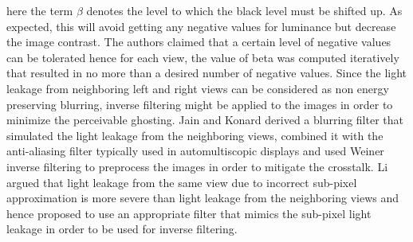 here the term $\beta$ denotes the level to which the black level must be shifted up. As expected, this will avoid getting any negative values for luminance but decrease the image contrast. The authors claimed that a certain level of negative values can be tolerated hence for each view, the value of beta was computed iteratively that resulted in no more than a desired number of negative values. Since the light leakage from neighboring left and right views can be considered as non energy preserving blurring, inverse filtering might be applied to the images in order to minimize the perceivable ghosting. Jain and Konard \cite{jain2007crosstalk} derived a blurring filter that simulated the light leakage from the neighboring views, combined it with the anti-aliasing filter typically used in automultiscopic displays and used Weiner inverse filtering to preprocess the images in order to mitigate the crosstalk. Li \cite{citation-0} argued that light leakage from the same view due to incorrect sub-pixel approximation is more severe than light leakage from the neighboring views and hence proposed to use an appropriate filter that mimics the sub-pixel light leakage in order to be used for inverse filtering.

